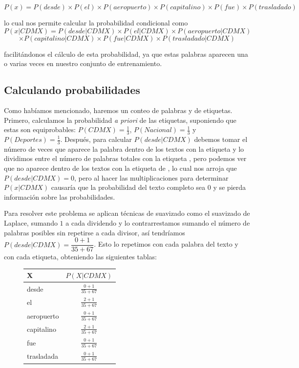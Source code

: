 \[ P(x) = P(desde) \times P(el) \times P(aeropuerto) \times P(capitalino) \times P(fue) \times P(trasladado) \]

lo cual nos permite calcular la probabilidad condicional como
\[ P(x | CDMX) = P(desde|CDMX) \times P(el|CDMX) \times P(aeropuerto|CDMX) \]
\[ \times P(capitalino|CDMX) \times P(fue|CDMX) \times P(trasladado|CDMX) \]

facilitándonos el cálculo de esta probabilidad, ya que estas palabras aparecen una o varias veces en nuestro conjunto de entrenamiento.

\subsection{Calculando probabilidades}

Como habíamos mencionado, haremos un conteo de palabras y de etiquetas. Primero, calculamos la probabilidad \textit{a priori} de las etiquetas, suponiendo que estas son equiprobables: \(P(CDMX) = \frac{1}{3}\), \(P(Nacional) = \frac{1}{3}\) y \(P(Deportes) = \frac{1}{3}\). Después, para calcular \(P(desde|CDMX)\) debemos tomar el número de veces que aparece la palabra  dentro de los textos con la etiqueta  y lo dividimos entre el número de palabras totales con la etiqueta , pero podemos ver que  no aparece dentro de los textos con la etiqueta de , lo cual nos arroja que \(P(desde|CDMX) = 0\), pero al hacer las multiplicaciones para determinar \(P(x| CDMX)\) causaría que la probabilidad del texto completo sea $0$ y se pierda información sobre las probabilidades.

Para resolver este problema se aplican técnicas de suavizado \parencite[ver][202]{ManningSchutze1999} como el suavizado de Laplace, sumando $1$ a cada dividendo y lo contrarrestamos sumando el número de palabras posibles sin repetirse a cada divisor, así tendríamos \(P(desde|CDMX) = \dfrac{0 + 1}{35 + 67}\). Esto lo repetimos con cada palabra del texto  y con cada etiqueta, obteniendo las siguientes tablas:

\begin{figure}[H]
  \begin{center}
    \begin{tabular}{ l | c }
      X & $P(X|CDMX)$ \\ \hline
      desde & $\frac{0 + 1}{35 + 67}$ \\ \hline
      el & $\frac{2 + 1}{35 + 67}$ \\ \hline
      aeropuerto & $\frac{0 + 1}{35 + 67}$ \\ \hline
      capitalino & $\frac{2 + 1}{35 + 67}$ \\ \hline
      fue & $\frac{0 + 1}{35 + 67}$ \\ \hline
      trasladada & $\frac{0 + 1}{35 + 67}$ \\
    \end{tabular}
  \end{center}
\end{figure}

